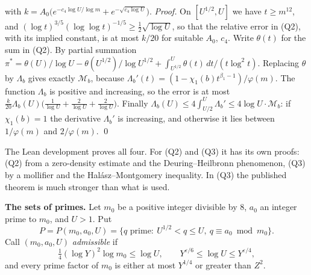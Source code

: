 \documentclass[11pt,letterpaper]{article}
\begin{document}
with $k=A_0\big(e^{-c_4\log U/\log m}+e^{-\sqrt{c_4\log U}}\big)$. \emph{Proof.} On $[U^{1/2},U]$ we have $t\ge m^{12}$, and $(\log t)^{3/5}(\log\log t)^{-1/5}\ge\frac12\sqrt{\log U}$, so that
the relative error in (Q2), with its implied constant, is at most $k/20$ for suitable $A_0$, $c_4$. Write $\theta(t)$ for the sum in (Q2). By partial summation
$\pi^*=\theta(U)/\log U-\theta(U^{1/2})/\log U^{1/2}+\int_{U^{1/2}}^U\theta(t)\,dt/(t\log^2t)$. Replacing $\theta$ by
$\Lambda_b$ gives exactly $\mathcal M_b$, because $\Lambda_b'(t)=(1-\chi_1(b)t^{\beta_1-1})/\varphi(m)$. The function
$\Lambda_b$ is positive and increasing, so the error is at most
$\frac k{20}\Lambda_b(U)\big(\frac1{\log U}+\frac2{\log U}+\frac2{\log U}\big)$. Finally
$\Lambda_b(U)\le4\int_{U/2}^U\Lambda_b'\le4\log U\cdot\mathcal M_b$: if $\chi_1(b)=1$ the derivative $\Lambda_b'$ is
increasing, and otherwise it lies between $1/\varphi(m)$ and $2/\varphi(m)$. \qed

The Lean development proves all four. For (Q2) and (Q3) it has its own proofs: (Q2) from a zero-density
estimate and the Deuring--Heilbronn phenomenon, (Q3) by a mollifier and the Hal\'asz--Montgomery inequality.
In (Q3) the published theorem is much stronger
than what is used.

\textbf{The sets of primes.} Let $m_0$ be a positive integer divisible by $8$, $a_0$ an integer prime to $m_0$, and $U>1$. Put
\begin{equation}\label{D:117}
 P=P(m_0,a_0,U)=\{q\text{ prime}:\ U^{1/2}<q\le U,\ q\equiv a_0\bmod m_0\}.
\end{equation}
Call $(m_0,a_0,U)$ \emph{admissible} if
\begin{equation}\label{III:adm}
 \tfrac14(\log Y)^2\log m_0\le\log U,\qquad Y^{\varepsilon/6}\le\log U\le Y^{\varepsilon/4},
\end{equation}
and every prime factor of $m_0$ is either at most $Y^{1/4}$ or greater than $Z^2$.
\end{document}
